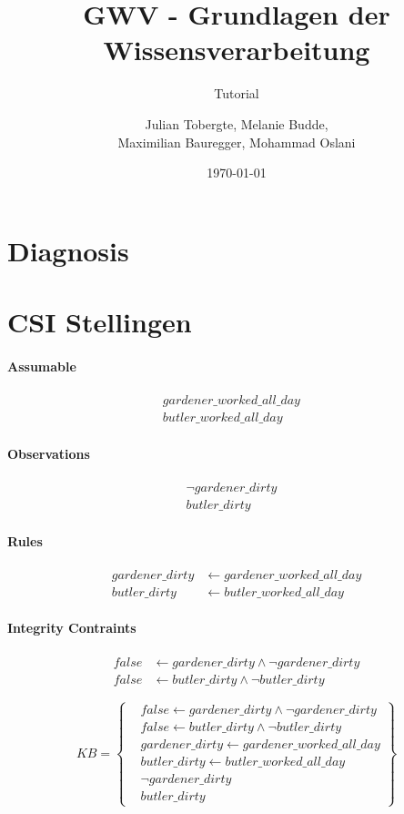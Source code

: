 \documentclass[DIV=9,numbers=noenddot]{scrartcl}
\title{GWV - Grundlagen der Wissensverarbeitung}
\subtitle{Tutorial \arabic{blatt}}
\author{Julian Tobergte, Melanie Budde,\\Maximilian Bauregger, Mohammad Oslani}
\date{\today}
\begin{document}
	\maketitle
	
	
	\section{Diagnosis}
	
	
	\newpage
	\section{CSI Stellingen}
	\paragraph{Assumable}
	\begin{align*}
		  gardener\_worked\_all\_day&
		\\butler\_worked\_all\_day&
	\end{align*}
	
	\paragraph{Observations}
	\begin{align*}
		  \neg gardener\_dirty&
		\\butler\_dirty&
	\end{align*}
	
	\paragraph{Rules}
	\begin{align*}
		  gardener\_dirty &\leftarrow gardener\_worked\_all\_day
		\\butler\_dirty &\leftarrow butler\_worked\_all\_day
	\end{align*}
	
	
	\paragraph{Integrity Contraints}
	\begin{align*}
		  false &\leftarrow gardener\_dirty \land \neg gardener\_dirty
		\\false &\leftarrow butler\_dirty \land \neg butler\_dirty
	\end{align*}
	
	\begin{equation}
		KB = \left\{
			\begin{aligned}
				&false \leftarrow gardener\_dirty \land \neg gardener\_dirty
				\\&false \leftarrow butler\_dirty \land \neg butler\_dirty
				\\&gardener\_dirty \leftarrow gardener\_worked\_all\_day
				\\&butler\_dirty \leftarrow butler\_worked\_all\_day
				\\&\neg gardener\_dirty
				\\&butler\_dirty
			\end{aligned}
		\right\}
	\end{equation}
	
\end{document}
